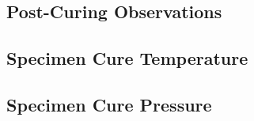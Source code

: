 \subsection{}


\subsection{}


\subsection{}


\subsection{}


\subsection{}


\clearpage
\subsection{Post-Curing Observations}


\subsection{Specimen Cure Temperature}


\subsection{Specimen Cure Pressure}


\subsection{}


\subsection{}


